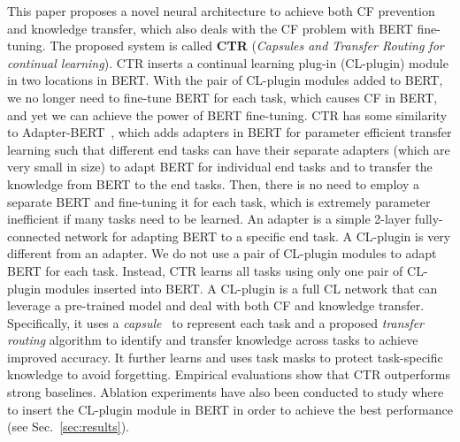 \documentclass{article}
\begin{document}
{\color{black}This paper proposes a novel neural architecture to {\color{black}achieve both CF prevention and knowledge transfer, which also deals with the CF problem with BERT fine-tuning.} The proposed system is called \textbf{CTR} (\textit{Capsules and Transfer Routing for continual learning}). CTR inserts a continual learning plug-in (CL-plugin) module in two locations in BERT. With the pair of CL-plugin modules added to BERT, we no longer need to fine-tune BERT for each task, which causes CF in BERT, and yet we can achieve the power of BERT fine-tuning. CTR has some similarity to Adapter-BERT~\cite{Houlsby2019Parameter}, {\color{black}which adds adapters in BERT} for parameter efficient transfer learning such that different end tasks can have their separate adapters (which are very small in size) to adapt BERT for individual end tasks and to transfer the knowledge from BERT to the end tasks. Then, there is no need to employ a separate BERT and fine-tuning it for each task, which is extremely parameter inefficient if many tasks need to be learned. An adapter is a simple 2-layer fully-connected network for adapting BERT to a specific end task. A CL-plugin is very different from an adapter. We do not use a pair of CL-plugin modules to adapt BERT for each task. Instead, CTR learns all tasks using only one pair of CL-plugin modules inserted into BERT. A CL-plugin is a full CL network that can leverage a pre-trained model and deal with both CF and knowledge transfer. Specifically, it uses a \textit{capsule}~\cite{hinton2011transforming} to represent each task and a proposed \textit{transfer routing} algorithm to identify and transfer knowledge across tasks to achieve improved accuracy. It further learns and uses task masks to protect task-specific knowledge to avoid forgetting. Empirical evaluations show that CTR outperforms strong baselines. Ablation experiments have also been conducted to study where to insert the CL-plugin module in BERT in order to achieve the best performance (see Sec.~\ref{sec:results}).  
}
\end{document}

